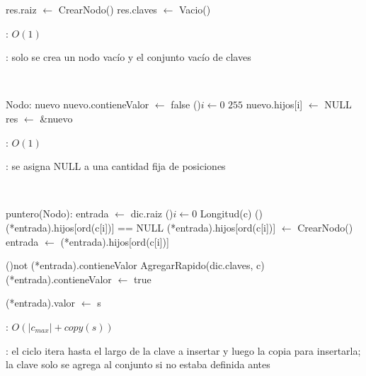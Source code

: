 \begin{Algoritmos}


	\begin{algorithm}[H]
		\NoCaptionOfAlgo
		\caption{}
		res.raiz $\leftarrow$ CrearNodo()
		res.claves $\leftarrow$ Vacio()
	\end{algorithm}

	\complejidad: $O(1)$

	\justifcomp: solo se crea un nodo vacío y el conjunto vacío de claves

	~

	\begin{algorithm}[H]
		\NoCaptionOfAlgo
		\caption{}
		Nodo: nuevo
		nuevo.contieneValor $\leftarrow$ false
		\For(){$i \leftarrow 0$ \KwTo $255$}{ 
			nuevo.hijos[i] $\leftarrow$ NULL
		}
		res $\leftarrow$ \&nuevo
	\end{algorithm}

	\complejidad: $O(1)$

	\justifcomp: se asigna NULL a una cantidad fija de posiciones

	~

	\begin{algorithm}[H]
		\NoCaptionOfAlgo
		\caption{}
		puntero(Nodo): entrada $\leftarrow$ dic.raiz
		\For(){$i \leftarrow 0$ \KwTo Longitud(c)}{
			\If(){(*entrada).hijos[ord(c[i])] == NULL} {
				(*entrada).hijos[ord(c[i])] $\leftarrow$ CrearNodo()
			}
			entrada $\leftarrow$ (*entrada).hijos[ord(c[i])]
		}

		\If(){not (*entrada).contieneValor} {
			AgregarRapido(dic.claves, c)
			(*entrada).contieneValor $\leftarrow$ true
		}

		(*entrada).valor $\leftarrow$ s
	\end{algorithm}

	\complejidad: $O(|c_{max}| + copy(s))$

	\justifcomp: el ciclo itera hasta el largo de la clave a insertar y luego la copia para insertarla; la clave solo se agrega al conjunto si no estaba definida antes


\end{Algoritmos}
